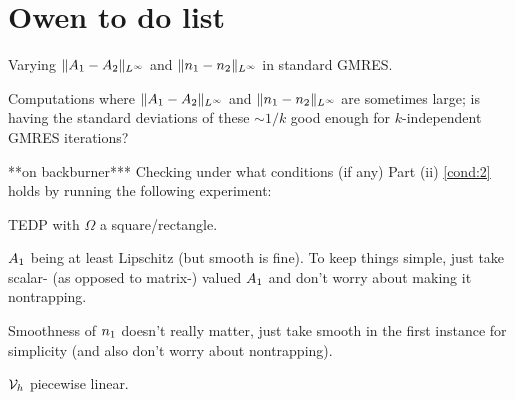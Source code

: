 
%
%
%

\section*{Owen to do list}
\ben
\item Varying  $\|A_{1}-A_{2}\|_{L^\infty}$ and $\|n_{1}-n_{2}\|_{L^\infty}$ in standard GMRES.
\item Computations where $\|A_{1}-A_{2}\|_{L^\infty}$ and $\|n_{1}-n_{2}\|_{L^\infty}$ are sometimes large; is having the standard deviations of these $\sim 1/k$ good enough for $k$-independent GMRES iterations?
\item ***on backburner*** Checking under what conditions (if any) Part (ii) \cref{cond:2} holds by running the following experiment:
\bit
\item TEDP with $\Omega$ a square/rectangle.
\item $A_{1}$ being at least Lipschitz (but smooth is fine). To keep things simple, just take scalar- (as opposed to matrix-) valued $A_{1}$ and don't worry about making it nontrapping.
\item Smoothness of $n_{1}$ doesn't really matter, just take smooth in the first instance for simplicity (and also don't worry about nontrapping).
\item $\mathcal V_h$ piecewise linear.
